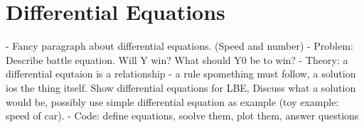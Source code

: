 \chapter[Differential Equations]{Differential Equations}

- Fancy paragraph about differential equations. (Speed and number)
- Problem: Describe battle equation. Will Y win? What should Y0 be to win?
- Theory: a differential equtaion is a relationship - a rule spomething must
follow, a solution ios the thing itself. Show differential equations for LBE,
Discuss what a solution would be, possibly use simple differential equation as
example (toy example: speed of car).
- Code: define equations, soolve them, plot them, answer questions
